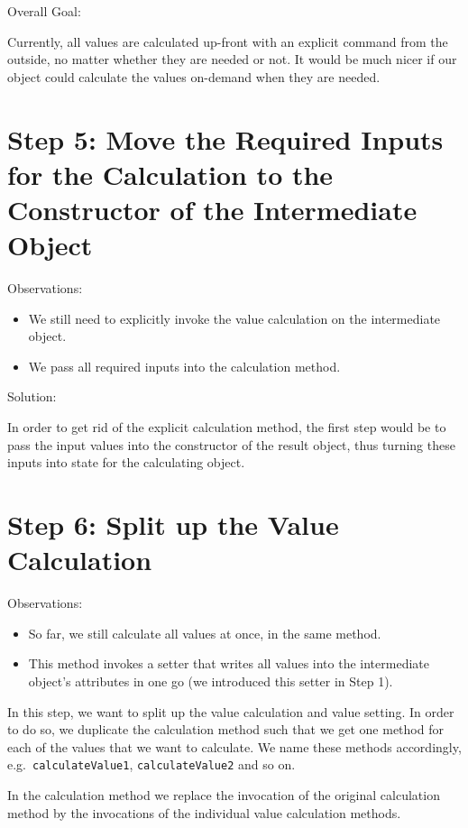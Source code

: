 \documentclass[a4paper,fleqn,titlepage,11pt]{article}
\begin{document}
Overall Goal:

Currently, all values are calculated up-front with an explicit command from the outside, no matter whether they are needed or not. It would be much nicer if our object could calculate the values on-demand when they are needed.


\section{Step 5: Move the Required Inputs for the Calculation to the Constructor of the Intermediate Object}

Observations:
\begin{itemize}
\item We still need to explicitly invoke the value calculation on the intermediate object. 
\item We pass all required inputs into the calculation method.
\end{itemize}

Solution:

In order to get rid of the explicit calculation method, the first step would be to pass the input values into the constructor of the result object, thus turning these inputs into state for the calculating object.

\section{Step 6: Split up the Value Calculation}

Observations:
\begin{itemize}
\item So far, we still calculate all values at once, in the same method. 
\item This method invokes a setter that writes all values into the intermediate object's attributes in one go (we introduced this setter in Step 1).
\end{itemize}

In this step, we want to split up the value calculation and value setting. In order to do so, we duplicate the calculation method such that we get one method for each of the values that we want to calculate. We name these methods accordingly, e.g.~\texttt{calculateValue1}, \texttt{calculateValue2} and so on.

In the calculation method we replace the invocation of the original calculation method by the invocations of the individual value calculation methods.
\end{document}

